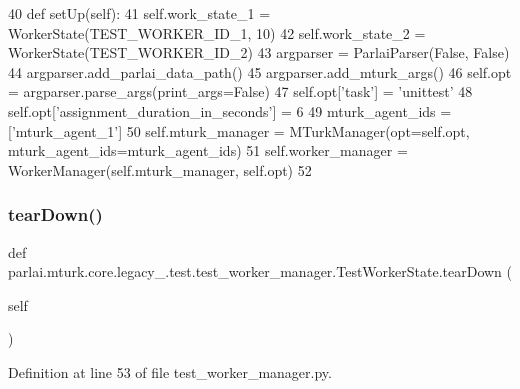 \begin{DoxyCode}
40     \textcolor{keyword}{def }setUp(self):
41         self.work\_state\_1 = WorkerState(TEST\_WORKER\_ID\_1, 10)
42         self.work\_state\_2 = WorkerState(TEST\_WORKER\_ID\_2)
43         argparser = ParlaiParser(\textcolor{keyword}{False}, \textcolor{keyword}{False})
44         argparser.add\_parlai\_data\_path()
45         argparser.add\_mturk\_args()
46         self.opt = argparser.parse\_args(print\_args=\textcolor{keyword}{False})
47         self.opt[\textcolor{stringliteral}{'task'}] = \textcolor{stringliteral}{'unittest'}
48         self.opt[\textcolor{stringliteral}{'assignment\_duration\_in\_seconds'}] = 6
49         mturk\_agent\_ids = [\textcolor{stringliteral}{'mturk\_agent\_1'}]
50         self.mturk\_manager = MTurkManager(opt=self.opt, mturk\_agent\_ids=mturk\_agent\_ids)
51         self.worker\_manager = WorkerManager(self.mturk\_manager, self.opt)
52 
\end{DoxyCode}
\mbox{\label{classparlai_1_1mturk_1_1core_1_1legacy__2018_1_1test_1_1test__worker__manager_1_1TestWorkerState_ace6d5f8fc93e8353a4812e58d4cedc47}} 
\subsubsection{\texorpdfstring{tear\+Down()}{tearDown()}}
{\footnotesize\ttfamily def parlai.\+mturk.\+core.\+legacy\+\_.\+test.\+test\+\_\+worker\+\_\+manager.\+Test\+Worker\+State.\+tear\+Down (\begin{DoxyParamCaption}\item[{}]{self }\end{DoxyParamCaption})}



Definition at line 53 of file test\+\_\+worker\+\_\+manager.\+py.


